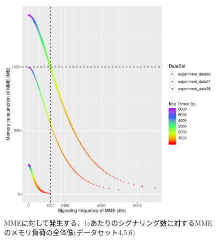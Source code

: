 \documentclass[a4j]{ujarticle}
\begin{document}

\begin{figure}[htbp]
  \centering
  \includegraphics[width=0.9\hsize]{4_5_6_signaling_vs_memoryload_all_10s.pdf}
  \caption{MMEに対して発生する、1sあたりのシグナリング数に対するMMEのメモリ負荷の全体像(データセット4,5,6)}
  \label{4_5_6_signaling_vs_memoryload_all}
\end{figure}
\end{document}
